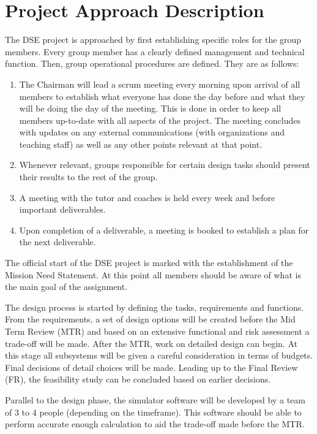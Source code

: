 \section{Project Approach Description}
\label{dseProjectApproachDescription}
The DSE project is approached by first establishing specific roles for the group members. Every group member has a clearly defined management and technical function. Then, group operational procedures are defined. They are as follows:

\begin{enumerate}
	\item The Chairman will lead a scrum meeting every morning upon arrival of all members to establish what everyone has done the day before and what they will be doing the day of the meeting. This is done in order to keep all members up-to-date with all aspects of the project. The meeting concludes with updates on any external communications (with organizations and teaching staff) as well as any other points relevant at that point.
	\item Whenever relevant, groups responsible for certain design tasks should present their results to the rest of the group.
	\item A meeting with the tutor and coaches is held every week and before important deliverables.
	\item Upon completion of a deliverable, a meeting is booked to establish a plan for the next deliverable.  
\end{enumerate}

The official start of the DSE project is marked with the establishment of the Mission Need Statement. At this point all members should be aware of what is the main goal of the assignment.

The design process is started by defining the tasks, requirements and functions. From the requirements, a set of design options will be created before the Mid Term Review (MTR) and based on an extensive functional and risk assessment a trade-off will be made. After the MTR, work on detailed design can begin. At this stage all subsystems will be given a careful consideration in terms of budgets. Final decisions of detail choices will be made. Leading up to the Final Review (FR), the feasibility study can be concluded based on earlier decisions.

Parallel to the design phase, the simulator software will be developed by a team of 3 to 4 people (depending on the timeframe). This software should be able to perform accurate enough calculation to aid the trade-off made before the MTR.